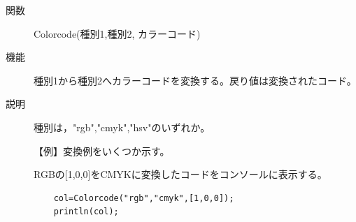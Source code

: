 \documentclass[papersize,a4paper,12pt,uplatex]{jsarticle}
\begin{document}
\begin{description}

\hypertarget{colorcode}{}
\item[関数]  Colorcode(種別1,種別2, カラーコード)
\item[機能]  種別1から種別2へカラーコードを変換する。戻り値は変換されたコード。
\item[説明]  種別は，"rgb","cmyk","hsv"のいずれか。

\vspace{\baselineskip}
【例】変換例をいくつか示す。

RGBの[1,0,0]をCMYKに変換したコードをコンソールに表示する。
\begin{verbatim}
    col=Colorcode("rgb","cmyk",[1,0,0]); 
    println(col); 
\end{verbatim}


\end{description}
\end{document}
